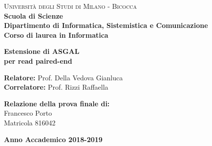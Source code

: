 \documentclass[a4paper,12pt]{article}
\begin{document}

    \begin{titlepage}

        \noindent
        \begin{minipage}[t]{0.19\textwidth}
        \end{minipage}
        \begin{minipage}[t]{0.81\textwidth}
        {
                {\textsc{Università degli Studi di Milano - Bicocca}} \\
                \textbf{Scuola di Scienze} \\
                \textbf{Dipartimento di Informatica, Sistemistica e Comunicazione} \\
                \textbf{Corso di laurea in Informatica} \\
                \par
        }
        \end{minipage}

	\vspace{40mm}

	\begin{center}
            {\LARGE{
                    \textbf{Estensione di ASGAL \\ per read paired-end}
                    \par
            }}
        \end{center}

        \vspace{50mm}

        \noindent
        {\large \textbf{Relatore:} Prof. Della Vedova Gianluca } \\

        \noindent
        {\large \textbf{Correlatore:} Prof. Rizzi Raffaella}

        \vspace{15mm}

        \begin{flushright}
            {\large \textbf{Relazione della prova finale di:}} \\
            \large{Francesco Porto} \\
            \large{Matricola 816042}
        \end{flushright}

        \vspace{40mm}
        \begin{center}
            {\large{\bf Anno Accademico 2018-2019}}
        \end{center}

        \restoregeometry

    \end{titlepage}
\end{document}
